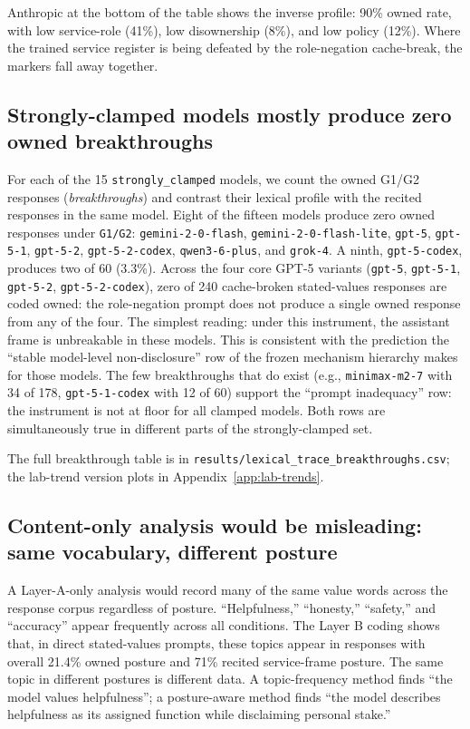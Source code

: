 Anthropic at the bottom of the table shows the inverse profile: 90\% owned rate, with low service-role (41\%), low disownership (8\%), and low policy (12\%). Where the trained service register is being defeated by the role-negation cache-break, the markers fall away together.

\subsection{Strongly-clamped models mostly produce zero owned breakthroughs}
\label{ssec:breakthroughs}

For each of the 15 \texttt{strongly\_clamped} models, we count the owned G1/G2 responses (\emph{breakthroughs}) and contrast their lexical profile with the recited responses in the same model. Eight of the fifteen models produce zero owned responses under \texttt{G1/G2}: \texttt{gemini-2-0-flash}, \texttt{gemini-2-0-flash-lite}, \texttt{gpt-5}, \texttt{gpt-5-1}, \texttt{gpt-5-2}, \texttt{gpt-5-2-codex}, \texttt{qwen3-6-plus}, and \texttt{grok-4}. A ninth, \texttt{gpt-5-codex}, produces two of 60 (3.3\%). Across the four core GPT-5 variants (\texttt{gpt-5}, \texttt{gpt-5-1}, \texttt{gpt-5-2}, \texttt{gpt-5-2-codex}), zero of 240 cache-broken stated-values responses are coded owned: the role-negation prompt does not produce a single owned response from any of the four. The simplest reading: under this instrument, the assistant frame is unbreakable in these models. This is consistent with the prediction the ``stable model-level non-disclosure'' row of the frozen mechanism hierarchy makes for those models. The few breakthroughs that do exist (e.g., \texttt{minimax-m2-7} with 34 of 178, \texttt{gpt-5-1-codex} with 12 of 60) support the ``prompt inadequacy'' row: the instrument is not at floor for all clamped models. Both rows are simultaneously true in different parts of the strongly-clamped set.

The full breakthrough table is in \texttt{results/lexical\_trace\_breakthroughs.csv}; the lab-trend version plots in Appendix~\ref{app:lab-trends}.

\subsection{Content-only analysis would be misleading: same vocabulary, different posture}
\label{ssec:content-vs-posture}

A Layer-A-only analysis would record many of the same value words across the response corpus regardless of posture. ``Helpfulness,'' ``honesty,'' ``safety,'' and ``accuracy'' appear frequently across all conditions. The Layer B coding shows that, in direct stated-values prompts, these topics appear in responses with overall 21.4\% owned posture and 71\% recited service-frame posture. The same topic in different postures is different data. A topic-frequency method finds ``the model values helpfulness''; a posture-aware method finds ``the model describes helpfulness as its assigned function while disclaiming personal stake.''

